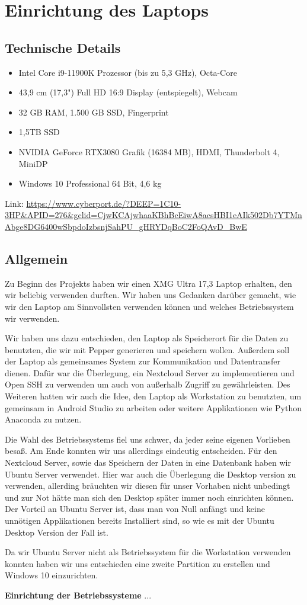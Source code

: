 \chapter{Einrichtung des Laptops}
\label{sec:laptop}

\section{Technische Details}
\begin{itemize}
    \item Intel Core i9-11900K Prozessor (bis zu 5,3 GHz), Octa-Core
    \item 43,9 cm (17,3") Full HD 16:9 Display (entspiegelt), Webcam
    \item 32 GB RAM, 1.500 GB SSD, Fingerprint
    \item 1,5TB SSD
    \item NVIDIA GeForce RTX3080 Grafik (16384 MB), HDMI, Thunderbolt 4, MiniDP
    \item Windows 10 Professional 64 Bit, 4,6 kg
\end{itemize}

Link:
\url{https://www.cyberport.de/?DEEP=1C10-3HP&APID=276&gclid=CjwKCAjwhaaKBhBcEiwA8acsHBI1eAIk502Db7YTMnAbge8DG6400wSbpdoIzbsnjSahPU_gHRYDqBoC2FoQAvD_BwE}

\section{Allgemein}
Zu Beginn des Projekts haben wir einen XMG Ultra 17,3 Laptop erhalten, den wir beliebig verwenden durften. Wir haben uns Gedanken darüber gemacht, wie wir den Laptop am Sinnvollsten verwenden können und welches Betriebssystem wir verwenden. 

Wir haben uns dazu entschieden, den Laptop als Speicherort für die Daten zu benutzten, die wir mit Pepper generieren und speichern wollen. Außerdem soll der Laptop als gemeinsames System zur Kommunikation und Datentransfer dienen. Dafür war die Überlegung, ein Nextcloud Server zu implementieren und Open SSH zu verwenden um auch von außerhalb Zugriff zu gewährleisten. Des Weiteren hatten wir auch die Idee, den Laptop als Workstation zu benutzten, um gemeinsam in Android Studio zu arbeiten oder weitere Applikationen wie Python Anaconda zu nutzen. 

Die Wahl des Betriebssystems fiel uns schwer, da jeder seine eigenen Vorlieben besaß. Am Ende konnten wir uns allerdings eindeutig entscheiden. 
Für den Nextcloud Server, sowie das Speichern der Daten in eine Datenbank haben wir Ubuntu Server verwendet. Hier war auch die Überlegung die Desktop version zu verwenden, allerding bräuchten wir diesen für unser Vorhaben nicht unbedingt und zur Not hätte man sich den Desktop später immer noch einrichten können. Der Vorteil an Ubuntu Server ist, dass man von Null anfängt und keine unnötigen Applikationen bereits Installiert sind, so wie es mit der Ubuntu Desktop Version der Fall ist. 

Da wir Ubuntu Server nicht als Betriebssystem für die Workstation verwenden konnten haben wir uns entschieden eine zweite Partition zu erstellen und Windows 10 einzurichten.

\textbf{Einrichtung der Betriebssysteme}
...